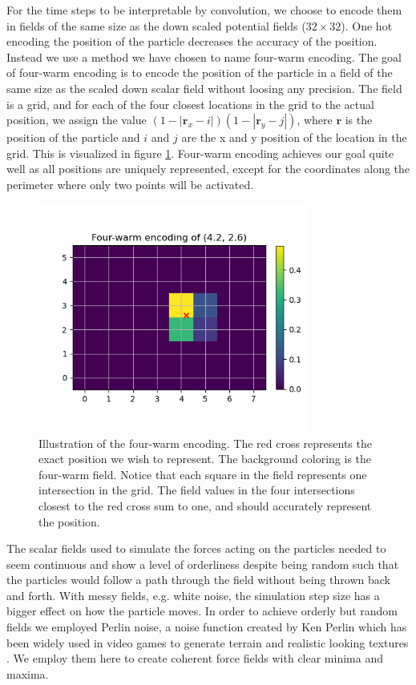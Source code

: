 \documentclass[a4paper]{article}
\renewcommand{\vec}[1]{\mathbf{#1}}
\begin{document}
For the time steps to be interpretable by convolution, we choose to encode them in fields of the same size as the down scaled potential fields ($32\times32$). One hot encoding the position of the particle decreases the accuracy of the position. Instead we use a method we have chosen to name four-warm encoding. The goal of four-warm encoding is to encode the position of the particle in a field of the same size as the scaled down scalar field without loosing any precision. The field is a grid, and for each of the four closest locations in the grid to the actual position, we assign the value $(1 - \left|\vec{r}_x - i\right|)(1 - \left|\vec{r}_y - j\right|)$, where $\vec{r}$ is the position of the particle and $i$ and $j$ are the x and y position of the location in the grid. This is visualized in figure \ref{fig:four-warm}. Four-warm encoding achieves our goal quite well as all positions are uniquely represented, except for the coordinates along the perimeter where only two points will be activated.

\begin{figure}
    \centering
    \includegraphics[width=0.8\textwidth]{Figures/four-warm-encoding.png}
    \caption{Illustration of the four-warm encoding. The red cross represents the exact
             position we wish to represent. The background coloring is the four-warm
             field. Notice that each square in the field represents one intersection in
             the grid. The field values in the four intersections closest to the red
             cross sum to one, and should accurately represent the position.}
    \label{fig:four-warm}
\end{figure}

The scalar fields used to simulate the forces acting on the particles needed to seem continuous and show a level of orderliness despite being random such that the particles would follow a path through the field without being thrown back and forth. With messy fields, e.g. white noise, the simulation step size has a bigger effect on how the particle moves. In order to achieve orderly but random fields we employed Perlin noise, a noise function created by Ken Perlin which has been widely used in video games to generate terrain and realistic looking textures \cite{perlin}. We employ them here to create coherent force fields with clear minima and maxima. 
\end{document}

